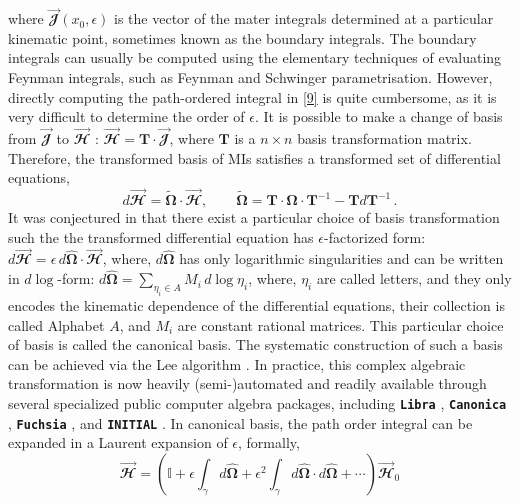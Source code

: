where $\vec{\mathbfcal{J}}(x_0,\epsilon)$ is the vector of the mater integrals determined at a particular kinematic point, sometimes known as the boundary integrals. The boundary integrals can usually be computed using the elementary techniques of evaluating Feynman integrals, such as Feynman and Schwinger parametrisation. However, directly computing the path-ordered integral in \eqref{9} is quite cumbersome, as it is very difficult to determine the order of $\epsilon$. It is possible to make a change of basis from $\vec{\mathbfcal{J}}$ to $\vec{\mathbfcal{H}}$ : $\vec{\mathbfcal{H}}=\mathbf{T}\cdot \vec{\mathbfcal{J}}$, where $\mathbf{T}$ is a $n\times  n$ basis transformation matrix. Therefore, the transformed basis of MIs satisfies a transformed set of differential equations,
\begin{equation}
d\vec{\mathbfcal{H}}=\widetilde{\boldsymbol{\Omega}}\cdot\vec{\mathbfcal{H}},\qquad  \widetilde{\boldsymbol{\Omega}}=\mathbf{T}\cdot \boldsymbol{\Omega}\cdot \mathbf{T}^{-1}-\mathbf{T}d\mathbf{T}^{-1}\,.
\end{equation}
It was conjectured in \cite{Henn:2013pwa} that there exist a particular choice of basis transformation such the the transformed differential equation has $\epsilon$-factorized form: $d\vec{\mathbfcal{H}}=\epsilon\,d{\hat{\boldsymbol{\Omega}}}\cdot\vec{\mathbfcal{H}}$, where, $d{\hat{\boldsymbol{\Omega}}}$ has only logarithmic singularities and can be written in $d\log$-form: $d{\hat{\boldsymbol{\Omega}}}=\sum_{\eta_i\in A}M_i\,d\log\eta_i$, where, $\eta_i$ are called letters, and they only encodes the kinematic dependence of the differential equations, their collection is called Alphabet $A$, and $M_i$ are constant rational matrices. This particular choice of basis is called the canonical basis. The systematic construction of such a basis can be achieved via the Lee algorithm \cite{Lee:2014ioa}. In practice, this complex algebraic transformation is now heavily (semi-)automated and readily available through several specialized public computer algebra packages, including \textbf{\texttt{Libra}} \cite{Lee:2020zfb}, \textbf{\texttt{Canonica}} \cite{Meyer:2017joq}, \textbf{\texttt{Fuchsia}} \cite{Gituliar:2017vzm}, and \textbf{\texttt{INITIAL}} \cite{Dlapa:2020cwj}. In canonical basis, the path order integral can be expanded in a Laurent expansion of $\epsilon$, formally,
\begin{equation}
    \vec{\mathbfcal{H}}=\left(\mathbb{I}+\epsilon\int_{\gamma} d\hat{\boldsymbol{\Omega}}+\epsilon^2\int_{\gamma}d\hat{\boldsymbol{\Omega}}\cdot d\hat{\boldsymbol{\Omega}}+\cdots\right)\vec{\mathbfcal{H}}_0
\end{equation}
